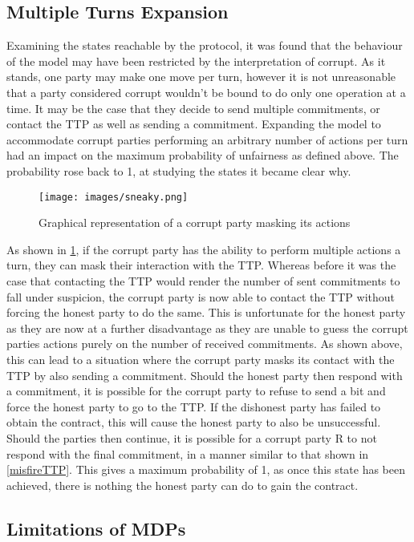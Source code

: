 \documentclass{l4proj}
\begin{document}
\subsection{Multiple Turns Expansion} 

Examining the states reachable by the protocol, it was found that the behaviour of the model may have been restricted by the interpretation of corrupt. As it stands, one party may make one move per turn, however it is not unreasonable that a party considered corrupt wouldn't be bound to do only one operation at a time. It may be the case that they decide to send multiple commitments, or contact the TTP as well as sending a commitment. Expanding the model to accommodate corrupt parties performing an arbitrary number of actions per turn had an impact on the maximum probability of unfairness as defined above. The probability rose back to 1, at studying the states it became clear why.

\begin{figure}[h!]
\centering
\texttt{[image: images/sneaky.png]}
\caption{Graphical representation of a corrupt party masking its actions}
\label{sneak}
\end{figure}

As shown in \ref{sneak}, if the corrupt party has the ability to perform multiple actions a turn, they can mask their interaction with the TTP. Whereas before it was the case that contacting the TTP would render the number of sent commitments to fall under suspicion, the corrupt party is now able to contact the TTP without forcing the honest party to do the same. This is unfortunate for the honest party as they are now at a further disadvantage as they are unable to guess the corrupt parties actions purely on the number of received commitments. As shown above, this can lead to a situation where the corrupt party masks its contact with the TTP by also sending a commitment. Should the honest party then respond with a commitment, it is possible for the corrupt party to refuse to send a bit and force the honest party to go to the TTP. If the dishonest party has failed to obtain the contract, this will cause the honest party to also be unsuccessful. Should the parties then continue, it is possible for a corrupt party R to not respond with the final commitment, in a manner similar to that shown in \ref{misfireTTP}. This gives a maximum probability of 1, as once this state has been achieved, there is nothing the honest party can do to gain the contract. 

\subsection{Limitations of MDPs}
\end{document}
